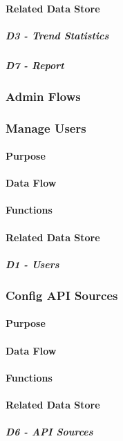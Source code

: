 \paragraph{Related Data Store}
\subparagraph{D3 - Trend Statistics}

\subparagraph{D7 - Report}

\subsubsection{Admin Flows}

\subsubsection*{Manage Users}
\paragraph{Purpose}

\paragraph{Data Flow}

\paragraph{Functions}

\paragraph{Related Data Store}
\subparagraph{D1 - Users}

\subsubsection*{Config API Sources}
\paragraph{Purpose}

\paragraph{Data Flow}

\paragraph{Functions}

\paragraph{Related Data Store}
\subparagraph{D6 - API Sources}

